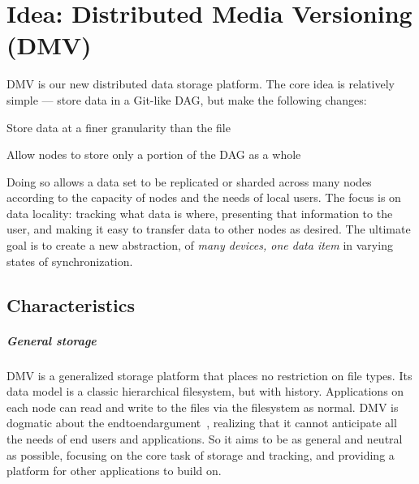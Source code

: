 \chapter{Idea: Distributed Media Versioning (DMV)}


\gls{DMV} is our new distributed data storage platform. The core idea is
relatively simple --- store data in a Git-like \gls{DAG}, but make the following
changes:

\begin{tight_enumerate}

    \item{Store data at a finer granularity than the file}

    \item{Allow nodes to store only a portion of the \gls{DAG} as a whole}

\end{tight_enumerate}

Doing so allows a data set to be replicated or sharded across many nodes
according to the capacity of nodes and the needs of local users. The focus is on
data locality: tracking what data is where, presenting that information to the
user, and making it easy to transfer data to other nodes as desired. The
ultimate goal is to create a new abstraction, of \emph{many devices, one data
item} in varying states of synchronization.

%


\section{Characteristics}
\label{dmv-characteristics}


\paragraph{General storage}

\gls{DMV} is a generalized storage platform that places no restriction on file
types. Its data model is a classic hierarchical filesystem, but with history.
Applications on each node can read and write to the files via the filesystem as
normal. \gls{DMV} is dogmatic about the
\gls{endtoendargument}~\cite{endtoendargument}, realizing that it cannot
anticipate all the needs of end users and applications. So it aims to be as
general and neutral as possible, focusing on the core task of storage and
tracking, and providing a platform for other applications to build on.



